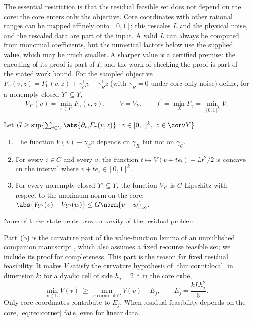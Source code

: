 The essential restriction is that the residual feasible set does not depend
on the core: the core enters only the objective. Core coordinates with other
rational ranges can be mapped affinely onto $[0,1]$; this rescales $L$ and
the physical noise, and the rescaled data are part of the input. A valid $L$
can always be computed from monomial coefficients, but the numerical factors
below use the supplied value, which may be much smaller. A sharper value is
a certified premise: the encoding of its proof is part of $I$, and the work
of checking the proof is part of the stated work bound. For the sampled
objective $F_\gamma(v,z)=F_0(v,z)+\gamma_C^{\mathsf T}v+\gamma_R^{\mathsf T}z$
(with $\gamma_R=0$ under core-only noise) define, for a nonempty closed
$Y'\subseteq Y$,
\begin{equation}\label{eq:rec:V}
 V_{Y'}(v)=\min_{z\in Y'}F_\gamma(v,z),\qquad V=V_Y,\qquad
 f^*=\min_XF_\gamma=\min_{[0,1]^k}V.
\end{equation}

\begin{lemma}\label{lem:rec:value}
Let $G\ge\sup\{\sum_{i\in C}\abs{\partial_{v_i}F_\gamma(v,z)}:
v\in[0,1]^k,\ z\in\conv Y\}$.
\begin{enumerate}[label=(\alph*)]
\item The function $V(v)-\gamma_C^{\mathsf T}v$ depends on $\gamma_R$ but not
on $\gamma_C$.
\item For every $i\in C$ and every $v$, the function
$t\mapsto V(v+te_i)-Lt^2/2$ is concave on the interval where
$v+te_i\in[0,1]^k$.
\item For every nonempty closed $Y'\subseteq Y$, the function $V_{Y'}$ is
$G$-Lipschitz with respect to the maximum norm on the core:
$\abs{V_{Y'}(v)-V_{Y'}(w)}\le G\norm{v-w}_\infty$.
\end{enumerate}
None of these statements uses convexity of the residual problem.
\end{lemma}

Part~(b) is the curvature part of the value-function lemma of an
unpublished companion manuscript \citep{companion-decomposition-aware}, which
also assumes a fixed recourse feasible set; we include its proof for
completeness. This part is the reason for fixed residual feasibility. It
makes $V$ satisfy
the curvature hypothesis of \cref{thm:count:local} in dimension $k$: for a
dyadic cell of side $h_j=2^{-j}$ in the core cube,
\begin{equation}\label{eq:rec:corner}
 \min_{v\in C}V(v)\ \ge\ \min_{v\text{ corner of }C}V(v)-E_j,
 \qquad E_j=\frac{kLh_j^2}8 .
\end{equation}
Only core coordinates contribute to $E_j$. When residual feasibility depends
on the core, \eqref{eq:rec:corner} fails, even for linear data.


